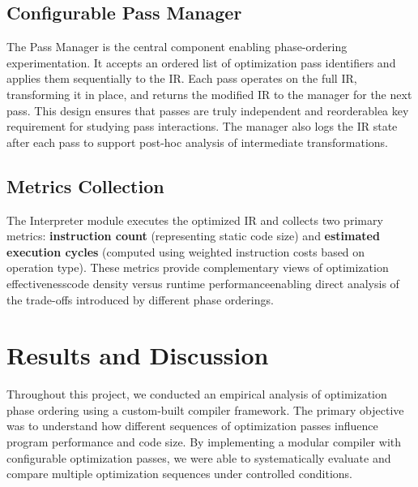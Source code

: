 \documentclass[conference]{IEEEtran}
\begin{document}
\subsection{Configurable Pass Manager}
The Pass Manager is the central component enabling phase-ordering experimentation. It accepts an ordered list of optimization pass identifiers and applies them sequentially to the IR. Each pass operates on the full IR, transforming it in place, and returns the modified IR to the manager for the next pass. This design ensures that passes are truly independent and reorderable\textemdash a key requirement for studying pass interactions. The manager also logs the IR state after each pass to support post-hoc analysis of intermediate transformations.

\subsection{Metrics Collection}
The Interpreter module executes the optimized IR and collects two primary metrics: \textbf{instruction count} (representing static code size) and \textbf{estimated execution cycles} (computed using weighted instruction costs based on operation type). These metrics provide complementary views of optimization effectiveness\textemdash code density versus runtime performance\textemdash enabling direct analysis of the trade-offs introduced by different phase orderings.

\section{Results and Discussion}
Throughout this project, we conducted an empirical analysis of optimization phase ordering using a custom-built compiler framework. The primary objective was to understand how different sequences of optimization passes influence program performance and code size. By implementing a modular compiler with configurable optimization passes, we were able to systematically evaluate and compare multiple optimization sequences under controlled conditions.
\end{document}
